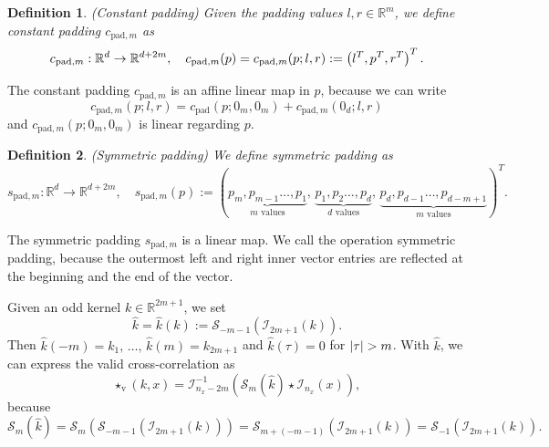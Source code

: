 \documentclass[twoside,a4paper]{article}
\newtheorem{definition}{Definition}
\begin{document}
\begin{definition}
	(Constant padding)
	Given the padding values $l,r \in \mathbb{R}^m$, we define constant padding 
	$c_{\text{pad},m}$ as
	\begin{equation*}
		c_{\text{pad},m} : \mathbb{R}^d \to \mathbb{R}^{d+2m},
		\quad c_{\text{pad},m}(p) = c_{\text{pad},m}(p;l,r) := \left( l^T, p^T, r^T \right)^T
		.
	\end{equation*}
\end{definition}
The constant padding $c_{\text{pad},m}$ is an affine linear map in $p$, because we can write
\begin{equation}\label{cpad_affine}
	c_{\text{pad},m}(p;l,r) = c_{\text{pad}}(p;0_m,0_m)
	+ c_{\text{pad},m}(0_d;l,r)
\end{equation}
and $c_{\text{pad},m}(p;0_m,0_m)$ is linear regarding $p$.

\begin{definition}
	(Symmetric padding)
	We define symmetric padding as
	\begin{equation*}
		s_{\text{pad},m} : \mathbb{R}^d \to \mathbb{R}^{d+2m},
		\quad s_{\text{pad},m}(p) := (
			\underbrace{p_m, p_{m-1} \dots, p_1}_{m \text{ values}}, \,
			\underbrace{p_1, p_2 \dots, p_d}_{d \text{ values}}, \,
			\underbrace{p_d, p_{d-1} \dots, p_{d-m+1}}_{m \text{ values}}
		)^T
		.
	\end{equation*}
\end{definition}
The symmetric padding $s_{\text{pad},m}$ is a linear map. We call the operation symmetric padding,
because the outermost left and right inner vector entries are reflected at the beginning and the end
of the vector.

Given an odd kernel $k \in \mathbb{R}^{2m+1}$, we set
\begin{equation*}
	\hat{k} = \hat{k}(k) := \mathcal{S}_{-m-1}(\mathcal{I}_{2m+1}(k))
	.
\end{equation*}
Then $\hat{k}(-m) = k_1, \, \dots,\, \hat{k}(m) = k_{2m+1}$ and
$\hat{k}(\tau)=0$ for $\left|{\tau}\right| > m$. With $\hat{k}$, we can express the valid cross-correlation as
\begin{equation*}
	\star_{\text{v}}(k,x) = \mathcal{I}_{n_x-2m}^{-1} (
		\mathcal{S}_{m}(\hat{k}) \star \mathcal{I}_{n_x}(x)
	)
	,
\end{equation*}
because
\begin{equation*}
	\mathcal{S}_{m}(\hat{k}) 
	= \mathcal{S}_{m}(\mathcal{S}_{-m-1}(\mathcal{I}_{2m+1}(k)))
	= \mathcal{S}_{m+(-m-1)}(\mathcal{I}_{2m+1}(k))
	= \mathcal{S}_{-1}(\mathcal{I}_{2m+1}(k))
	.
\end{equation*}
\end{document}

